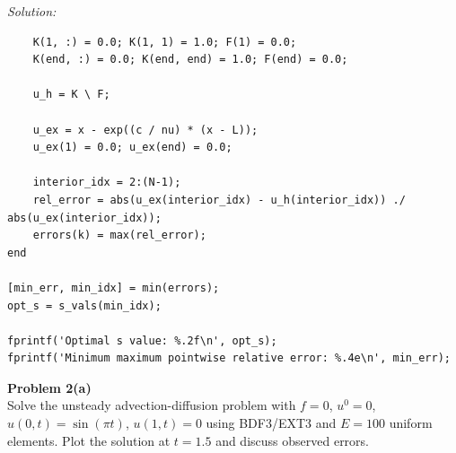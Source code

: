 \documentclass[11pt]{article}
\newenvironment{problem}[2][Problem]
    { \begin{mdframed}[backgroundcolor=gray!20] \textbf{#1 #2} \\}
    {  \end{mdframed}}
\newenvironment{solution}
    {\textit{Solution:}}
    {}
\begin{document}
\begin{solution}
\begin{lstlisting}
    K(1, :) = 0.0; K(1, 1) = 1.0; F(1) = 0.0;
    K(end, :) = 0.0; K(end, end) = 1.0; F(end) = 0.0;

    u_h = K \ F;

    u_ex = x - exp((c / nu) * (x - L));
    u_ex(1) = 0.0; u_ex(end) = 0.0;

    interior_idx = 2:(N-1);
    rel_error = abs(u_ex(interior_idx) - u_h(interior_idx)) ./ abs(u_ex(interior_idx));
    errors(k) = max(rel_error);
end

[min_err, min_idx] = min(errors);
opt_s = s_vals(min_idx);

fprintf('Optimal s value: %.2f\n', opt_s);
fprintf('Minimum maximum pointwise relative error: %.4e\n', min_err);
\end{lstlisting}

\end{solution}

\begin{problem}{2(a)}
Solve the unsteady advection-diffusion problem with $f=0$, $u^0=0$, $u(0,t)=\sin(\pi t)$, $u(1,t)=0$
using BDF3/EXT3 and $E=100$ uniform elements. Plot the solution at $t=1.5$ and discuss observed errors.
\end{problem}
\end{document}
